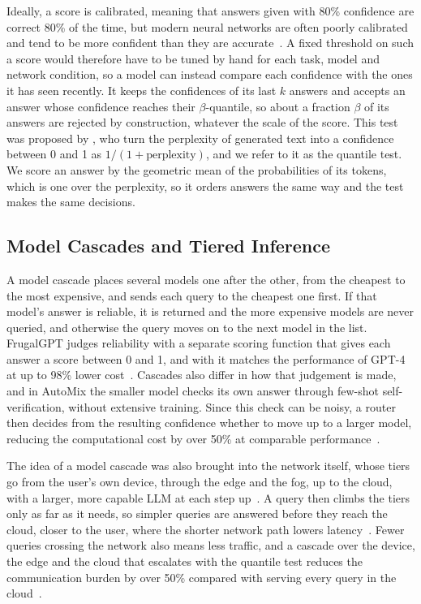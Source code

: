\documentclass[cic,dipl,english]{infufrgs}
\begin{document}
Ideally, a score is calibrated, meaning that answers given with 80\% confidence are
correct 80\% of the time, but modern neural networks are often poorly calibrated and
tend to be more confident than they are accurate~\cite{guo2017calibration}. A fixed
threshold on such a score would therefore have to be tuned by hand for each task, model
and network condition, so a model can instead compare each confidence with the ones it
has seen recently. It keeps the confidences of its last $k$ answers and accepts an answer
whose confidence reaches their $\beta$-quantile, so about a fraction $\beta$ of its
answers are rejected by construction, whatever the scale of the score. This test was
proposed by , who turn the perplexity of generated text into a
confidence between 0 and 1 as $1/(1+\text{perplexity})$, and we refer to it as the quantile
test. We score an answer by the geometric mean of the probabilities of its tokens, which is one
over the perplexity, so it orders answers the same way and the test makes the same decisions.

\subsection{Model Cascades and Tiered Inference}
\label{sec:cascades-tiers}

A model cascade places several models one after the other, from the cheapest to the most
expensive, and sends each query to the cheapest one first. If that model's answer is
reliable, it is returned and the more expensive models are never queried, and otherwise
the query moves on to the next model in the list. FrugalGPT judges reliability with a separate scoring function that gives
each answer a score between 0 and 1, and with it matches the performance of GPT-4 at up
to 98\% lower cost~\cite{chen2024frugalgpt}. Cascades also differ in how that
judgement is made, and in AutoMix the smaller model checks its own answer through
few-shot self-verification, without extensive training. Since this check can be noisy, a router then decides from the
resulting confidence whether to move up to a larger model, reducing the computational
cost by over 50\% at comparable performance~\cite{aggarwal2023automix}.

The idea of a model cascade was also brought into the network itself, whose tiers go
from the user's own device, through the edge and the fog, up to the cloud, with a larger,
more capable LLM at each step up~\cite{pakpahan2026continuum}. A query then climbs the
tiers only as far as it needs, so simpler queries are answered before they reach the
cloud, closer to the user, where the shorter network path lowers
latency~\cite{chen2026network}. Fewer queries crossing the network also means less
traffic, and a cascade over the device, the edge and the cloud that escalates with the
quantile test reduces the communication burden by over 50\% compared with serving every
query in the cloud~\cite{wu2025recserve}.
\end{document}
